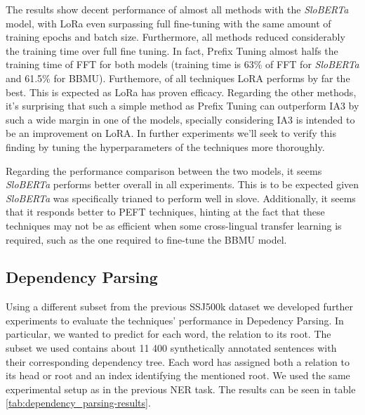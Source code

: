\documentclass[fleqn,moreauthors,10pt]{ds_report}
\begin{document}
The results show decent performance of almost all methods with the \textit{SloBERTa} model, with LoRa even surpassing full fine-tuning with the same amount of training epochs and batch size. Furthermore, all methods reduced considerably the training time over full fine tuning. In fact, Prefix Tuning almost halfs the training time of FFT for both models (training time is 63\% of FFT for \textit{SloBERTa} and 61.5\% for BBMU). Furthemore, of all techniques LoRA performs by far the best. This is expected as LoRa has proven efficacy. Regarding the other methods, it's surprising that such a simple method as Prefix Tuning can outperform IA3 by such a wide margin in one of the models, specially considering IA3 is intended to be an improvement on LoRA. In further experiments we'll seek to verify this finding by tuning the hyperparameters of the techniques more thoroughly.

Regarding the performance comparison between the two models, it seems \textit{SloBERTa} performs better overall in all experiments. This is to be expected given \textit{SloBERTa} was specifically trianed to perform well in slove. Additionally, it seems that it responds better to PEFT techniques, hinting at the fact that these techniques may not be as efficient when some cross-lingual transfer learning is required, such as the one required to fine-tune the BBMU model.

\subsection{Dependency Parsing}

Using a different subset from the previous SSJ500k dataset we developed further experiments to evaluate the techniques' performance in Depedency Parsing. In particular, we wanted to predict for each word, the relation to its root. The subset we used contains about 11 400 synthetically annotated sentences with their corresponding dependency tree. Each word has assigned both a relation to its head or root and an index identifying the mentioned root. We used the same experimental setup as in the previous NER task. The results can be seen in table \ref{tab:dependency_parsing-results}.
\end{document}
